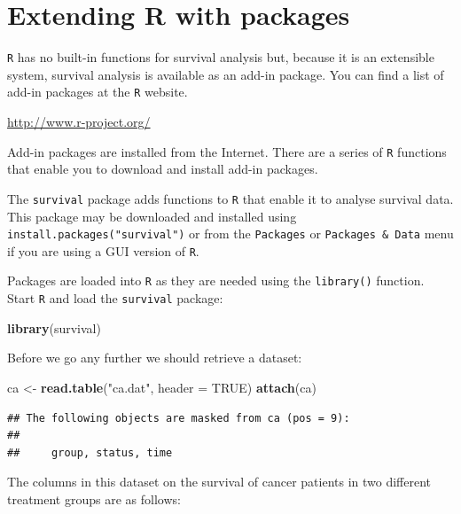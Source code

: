 \documentclass[12pt,]{book}
\newenvironment{Shaded}{\begin{snugshade}}{\end{snugshade}}
\newcommand{\KeywordTok}[1]{\textcolor[rgb]{0.13,0.29,0.53}{\textbf{#1}}}
\newcommand{\DataTypeTok}[1]{\textcolor[rgb]{0.13,0.29,0.53}{#1}}
\newcommand{\StringTok}[1]{\textcolor[rgb]{0.31,0.60,0.02}{#1}}
\newcommand{\OtherTok}[1]{\textcolor[rgb]{0.56,0.35,0.01}{#1}}
\newcommand{\NormalTok}[1]{#1}
\theoremstyle{definition}
\theoremstyle{definition}
\theoremstyle{definition}
\theoremstyle{remark}
\begin{document}
\hypertarget{exercise5}{%
\chapter{Extending R with packages}\label{exercise5}}

\texttt{R} has no built-in functions for survival analysis but, because
it is an extensible system, survival analysis is available as an add-in
package. You can find a list of add-in packages at the \texttt{R}
website.

\url{http://www.r-project.org/}

Add-in packages are installed from the Internet. There are a series of
\texttt{R} functions that enable you to download and install add-in
packages.

The \texttt{survival} package adds functions to \texttt{R} that enable
it to analyse survival data. This package may be downloaded and
installed using \texttt{install.packages("survival")} or from the
\texttt{Packages} or \texttt{Packages\ \&\ Data} menu if you are using a
GUI version of \texttt{R}.

Packages are loaded into \texttt{R} as they are needed using the
\texttt{library()} function. Start \texttt{R} and load the
\texttt{survival} package:

\begin{Shaded}
\begin{Highlighting}[]
\KeywordTok{library}\NormalTok{(survival)}
\end{Highlighting}
\end{Shaded}

Before we go any further we should retrieve a dataset:

\begin{Shaded}
\begin{Highlighting}[]
\NormalTok{ca <-}\StringTok{ }\KeywordTok{read.table}\NormalTok{(}\StringTok{"ca.dat"}\NormalTok{, }\DataTypeTok{header =} \OtherTok{TRUE}\NormalTok{)}
\KeywordTok{attach}\NormalTok{(ca)}
\end{Highlighting}
\end{Shaded}

\begin{verbatim}
## The following objects are masked from ca (pos = 9):
## 
##     group, status, time
\end{verbatim}

The columns in this dataset on the survival of cancer patients in two
different treatment groups are as follows:
\end{document}

